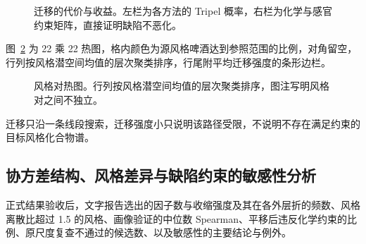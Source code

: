 \begin{figure}[htbp]\centering
{}
\caption{迁移的代价与收益。左栏为各方法的 Tripel 概率，右栏为化学与感官约束矩阵，直接证明缺陷不恶化。}
\label{fig:q3-transfer-fig}
\end{figure}

图~\ref{fig:q3-pairs} 为 22 乘 22 热图，格内颜色为源风格啤酒达到参照范围的比例，对角留空，行列按风格潜空间均值的层次聚类排序，行尾附平均迁移强度的条形边栏。

\begin{figure}[htbp]\centering
{}
\caption{风格对热图。行列按风格潜空间均值的层次聚类排序，图注写明风格对之间不独立。}
\label{fig:q3-pairs}
\end{figure}

迁移只沿一条线段搜索，迁移强度小只说明该路径受限，不说明不存在满足约束的目标风格化合物谱。

\subsection{协方差结构、风格差异与缺陷约束的敏感性分析}

正式结果验收后，文字报告选出的因子数与收缩强度及其在各外层折的频数、风格离散比超过 1.5 的风格、画像验证的中位数 Spearman、平移后违反化学约束的比例、原尺度复查不通过的候选数、以及敏感性的主要结论与例外。
